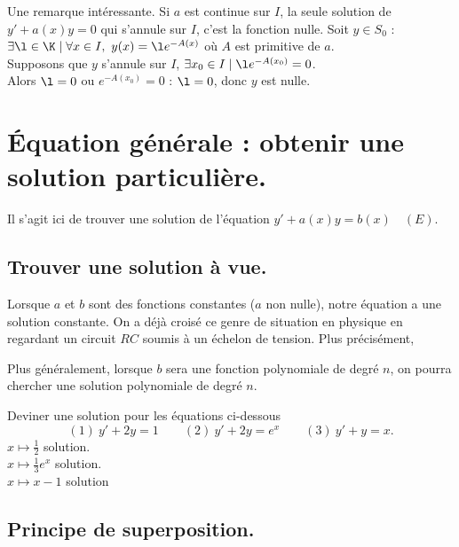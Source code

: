 \documentclass[11pt]{article}
\begin{document}
\begin{lemme}{Une remarque intéressante.}{}
    Si $a$ est continue sur $I$, la seule solution de $y'+a(x)y=0$ qui s'annule sur $I$, c'est la fonction nulle.
    \tcblower
    Soit $y\in S_0$ : $\exists \l \in \K \mid \forall x \in I,~ y(x)=\l e^{-A(x)}$ où $A$ est primitive de $a$.\\
    Supposons que $y$ s'annule sur $I$, $\exists x_0\in I\mid \l e^{-A(x_0)}=0$.\\
    Alors $\l=0$ ou $e^{-A(x_0)}=0$ : $\l = 0$, donc $y$ est nulle.
\end{lemme}

\section{Équation générale : obtenir une solution particulière.}

Il s'agit ici de trouver une solution de l'équation $y'+a(x)y=b(x)\quad(E)$.

\subsection{Trouver une solution à vue.}

\quad Lorsque $a$ et $b$ sont des fonctions constantes ($a$ non nulle), notre équation a une solution constante. On a déjà croisé ce genre de situation en physique en regardant un circuit $RC$ soumis à un échelon de tension.\n
Plus précisément,
\begin{center}
\end{center}
\quad Plus généralement, lorsque $b$ sera une fonction polynomiale de degré $n$, on pourra chercher une solution polynomiale de degré $n$.

\begin{ex}{}{}
    Deviner une solution pour les équations ci-dessous
    \begin{equation*}
        (1)~y'+2y=1 \qquad (2)~y'+2y=e^x \qquad (3)~y'+y=x.
    \end{equation*}
    \tcblower
     $x\mapsto\frac{1}{2}$ solution.\\
     $x\mapsto\frac{1}{3}e^x$ solution.\\
     $x\mapsto x-1$ solution
\end{ex}

\subsection{Principe de superposition.}
\end{document}
